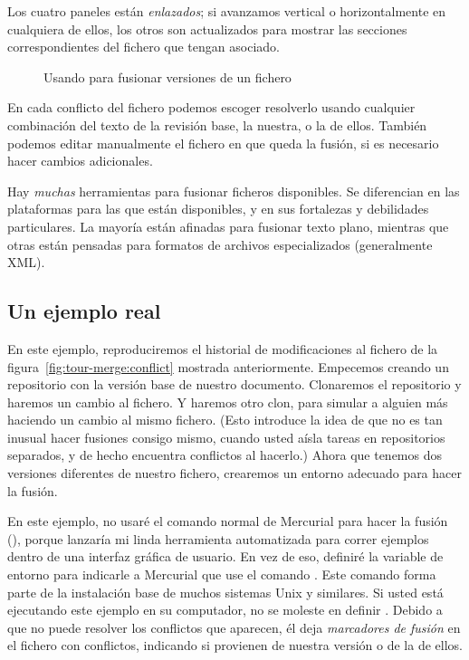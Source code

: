Los cuatro paneles están \emph{enlazados}; si avanzamos vertical o
horizontalmente en cualquiera de ellos, los otros son actualizados
para mostrar las secciones correspondientes del fichero que tengan
asociado.

\begin{figure}[ht]
  \centering
  \caption{Usando  para fusionar versiones de un
  fichero}
  \label{fig:tour-merge:kdiff3}
\end{figure}

En cada conflicto del fichero podemos escoger resolverlo usando
cualquier combinación del texto de la revisión base, la nuestra, o la
de ellos. También podemos editar manualmente el fichero en que queda
la fusión, si es necesario hacer cambios adicionales.

Hay \emph{muchas} herramientas para fusionar ficheros disponibles. Se
diferencian en las plataformas para las que están disponibles, y en
sus fortalezas y debilidades particulares. La mayoría están afinadas
para fusionar texto plano, mientras que otras están pensadas para
formatos de archivos especializados (generalmente XML).

\subsection{Un ejemplo real}

En este ejemplo, reproduciremos el historial de modificaciones al
fichero de la figura~\ref{fig:tour-merge:conflict} mostrada
anteriormente.  Empecemos creando un repositorio con la versión base
de nuestro documento.
Clonaremos el repositorio y haremos un cambio al fichero.
Y haremos otro clon, para simular a alguien más haciendo un cambio al
mismo fichero. (Esto introduce la idea de que no es tan inusual hacer
fusiones consigo mismo, cuando usted aísla tareas en repositorios
separados, y de hecho encuentra conflictos al hacerlo.)
Ahora que tenemos dos versiones diferentes de nuestro fichero,
crearemos un entorno adecuado para hacer la fusión.

En este ejemplo, no usaré el comando normal de Mercurial para hacer la
fusión (), porque lanzaría mi linda herramienta
automatizada para correr ejemplos dentro de una interfaz gráfica de
usuario. En vez de eso, definiré la variable de entorno
 para indicarle a Mercurial que use el comando
. Este comando forma parte de la instalación base de
muchos sistemas Unix y similares. Si usted está ejecutando este
ejemplo en su computador, no se moleste en definir .
Debido a que  no puede resolver los conflictos que
aparecen, él deja \emph{marcadores de fusión} en el fichero con
conflictos, indicando si provienen de nuestra versión o de la de
ellos.

